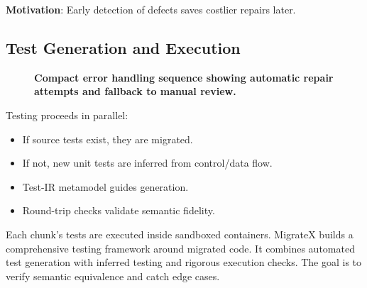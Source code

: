 \documentclass[twocolumn]{article}
\begin{document}
\textbf{Motivation}: Early detection of defects saves costlier repairs later.

\subsection{Test Generation and Execution}
\begin{figure}[htbp]
    \centering
    \caption{\textbf{Compact error handling sequence showing automatic repair attempts and fallback to manual review.}}
    \label{fig:error_handling_compact}
    \end{figure}
    
    
Testing proceeds in parallel:

\begin{itemize}
    \item If source tests exist, they are migrated.
    \item If not, new unit tests are inferred from control/data flow.
    \item Test-IR metamodel guides generation.
    \item Round-trip checks validate semantic fidelity.
\end{itemize}

Each chunk’s tests are executed inside sandboxed containers.
MigrateX builds a comprehensive testing framework around migrated code. It combines automated test generation with inferred testing and rigorous execution checks. The goal is to verify semantic equivalence and catch edge cases.
\end{document}
